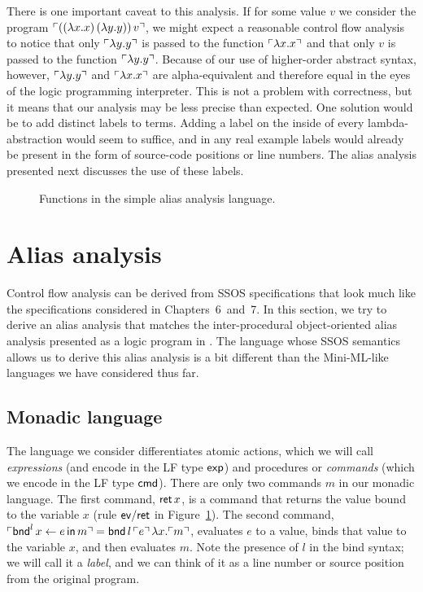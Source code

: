 There is one important caveat to this analysis. If for some value $v$
we consider the program ${\ulcorner{((\lambda x.x)\,(\lambda y.y))\,v}\urcorner}$,
we might expect a reasonable control flow analysis to notice that only
${\ulcorner{\lambda y.y}\urcorner}$ is passed to the function ${\ulcorner{\lambda
  x.x}\urcorner}$ and that only $v$ is passed to the function ${\ulcorner{\lambda
  y.y}\urcorner}$. Because of our use of higher-order abstract syntax, however,
${\ulcorner{\lambda y.y}\urcorner}$ and ${\ulcorner{\lambda x.x}\urcorner}$ are alpha-equivalent
and therefore equal in the eyes of the logic programming
interpreter. This is not a problem with correctness, but it means that
our analysis may be less precise than expected. One solution would be
to add distinct labels to terms. Adding a label on the inside of every
lambda-abstraction would seem to suffice, and in any real example
labels would already be present in the form of source-code positions
or line numbers. The alias analysis presented next discusses the use of
these labels.

\begin{figure}
\caption{Functions in the simple alias analysis language.}
\label{fig:ssos-monadic}
\end{figure}

\section{Alias analysis}

Control flow analysis can be derived from SSOS specifications that
look much like the specifications considered in Chapters~6~and~7.  In
this section, we try to derive an alias analysis that matches the
inter-procedural object-oriented alias analysis presented as a logic
program in \cite[Chapter 12.4]{aho07compilers}. The language whose
SSOS semantics allows us to derive this alias analysis is a bit
different than the Mini-ML-like languages we have considered thus far.

\subsection{Monadic language}

The language we consider differentiates atomic actions, which we will
call {\it expressions} (and encode in the LF type ${\sf exp}$) and
procedures or {\it commands} (which we encode in the LF type ${\sf
  cmd}$). There are only two commands $m$ in our monadic language. The
first command, ${\sf ret}\,x$, is a command that returns the value
bound to the variable $x$ (rule ${\sf ev/ret}$ in
Figure~\ref{fig:ssos-monadic}). The second command, ${\ulcorner{{\sf
    bnd}^l\, x \leftarrow e \,{\sf in}\,m}\urcorner} = {\sf
  bnd}\,l\,{\ulcorner{e}\urcorner}\,\lambda x.{\ulcorner{m}\urcorner}$, evaluates $e$ to a
value, binds that value to the variable $x$, and then evaluates
$m$. Note the presence of $l$ in the bind syntax; we will call it a
{\it label}, and we can think of it as a line number or source
position from the original program.

